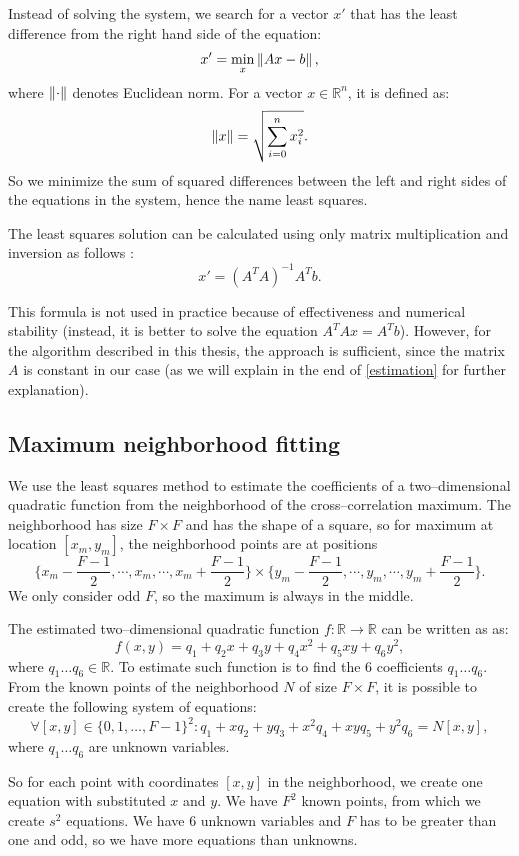Instead of solving the system, we search for a vector $x'$ that has the least difference from the right hand side of the equation:
\[
x' = \min_x \left\lVert Ax - b\right\rVert,
\]
where $\left\lVert\cdot\right\rVert$ denotes Euclidean norm. For a vector $x \in \mathbb{R}^n$, it is defined as:
\[
\left\lVert x\right\rVert = \sqrt{\sum_{i=0}^{n} x_i^2}.
\]
So we minimize the sum of squared differences between the left and right sides of the equations in the system, hence the name least squares.

The least squares solution can be calculated using only matrix multiplication and inversion as follows \cite{anton2013elementary}:  
\[
x' = (A^TA)^{-1}A^Tb.
\]

This formula is not used in practice because of effectiveness and numerical stability (instead, it is better to solve the equation $A^TAx = A^Tb$). However, for the algorithm described in this thesis, the approach is sufficient, since the matrix $A$ is constant in our case (as we will explain in the end of \cref{estimation} for further explanation).

\subsection{Maximum neighborhood fitting}

We use the least squares method to estimate the coefficients of a two--dimensional quadratic function from the neighborhood of the cross--cor\-re\-la\-tion maximum. The neighborhood has size $F \times F$ and has the shape of a square, so for maximum at location $[x_m, y_m]$, the neighborhood points are at positions 
\[
\{x_m - \frac{F-1}{2}, \cdots, x_m, \cdots, x_m + \frac{F-1}{2}\} \times \{y_m - \frac{F-1}{2}, \cdots, y_m, \cdots, y_m + \frac{F-1}{2}\}.
\]
We only consider odd $F$, so the maximum is always in the middle.

The estimated two--dimensional quadratic function $f:\mathbb{R} \rightarrow \mathbb{R}$ can be written as as:
\[
f(x,y) = q_1 + q_2x + q_3y + q_4x^2 + q_5xy + q_6y^2,
\]
where $q_1 \dots q_6 \in \mathbb{R}$. To estimate such function is to find the 6 coefficients $q_1 \dots q_6$. From the known points of the neighborhood $N$ of size $F \times F$, it is possible to create the following system of equations:
\[
\forall [x,y] \in \{0,1,\dots , F-1\}^2 : q_1 + xq_2 + yq_3 + x^2q_4 + xyq_5 + y^2q_6 = N[x,y],
\]
where $q_1 \dots q_6$ are unknown variables.

So for each point with coordinates $[x,y]$ in the neighborhood, we create one equation with substituted $x$ and $y$. We have $F^2$ known points, from which we create $s^2$ equations. We have 6 unknown variables and $F$ has to be greater than one and odd, so we have more equations than unknowns. 

